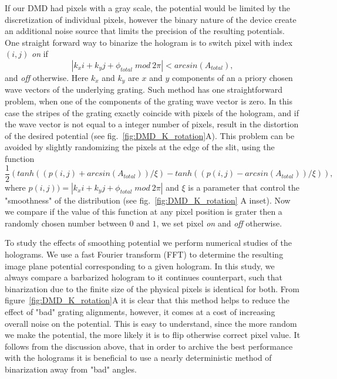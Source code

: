 If our DMD had pixels with a gray scale, the potential would be limited by the discretization of individual pixels, however the binary nature of the device create an additional noise source that limits the precision of the resulting potentials. One straight forward way to binarize the hologram is to switch pixel with index $(i,j)$ \textit{on} if 
\begin{equation}
\left| k_x i + k_y j + \phi_{total} \; mod \: 2 \pi \right| < arcsin(A_{total}),
\end{equation}
and \textit{off} otherwise. Here $k_x$ and $k_y$ are $x$ and $y$ components of an a priory chosen wave vectors of the underlying grating. Such method has one straightforward problem, when one of the components of the grating wave vector is zero. In this case the stripes of the grating exactly coincide with pixels of the hologram, and if the wave vector is not equal to a integer number of pixels, result in the distortion of the desired potential (see fig.~\ref{fig:DMD_K_rotation}A). This problem can be avoided by slightly randomizing the pixels at the edge of the slit, using the function 
\begin{equation}
\frac{1}{2}(tanh((p(i,j) + arcsin(A_{total}))/\xi) - tanh((p(i,j) - arcsin(A_{total}))/\xi)),
\end{equation}
where $p(i,j))=\left| k_x i + k_y j + \phi_{total} \; mod \: 2 \pi \right|$ and $\xi$ is a parameter that control the "smoothness" of the distribution (see fig.~\ref{fig:DMD_K_rotation} A inset). Now we compare if the value of this function at any pixel position is grater then a randomly chosen number between $0$ and $1$, we set pixel \textit{on} and \textit{off} otherwise. 

To study the effects of smoothing potential we perform numerical studies of the holograms. We use a fast Fourier transform (FFT) to determine the resulting image plane potential corresponding to a given hologram. In this study, we always compare a barbarized hologram to it continues counterpart, such that binarization due to the finite size of the physical pixels is identical for both. From figure~\ref{fig:DMD_K_rotation}A it is clear that this method helps to reduce the effect of "bad" grating alignments, however, it comes at a cost of increasing overall noise on the potential. This is easy to understand, since the more random we make the potential, the more likely it is to flip otherwise correct pixel value. It follows from the discussion above, that in order to archive the best performance with the holograms it is beneficial to use a nearly deterministic method of binarization away from "bad" angles. 

